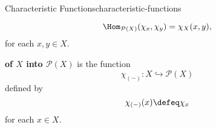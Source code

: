 \begin{definition}{Characteristic Functions}{characteristic-functions}
\begin{enumerate}
{                \[%
                    \Hom_{\mathcal{P}(X)}(\chi_{x},\chi_{y})%
                    =%
                    \chi_{X}(x,y),%
                \]%
                for each $x,y\in X$.
                \par\vspace*{-1.75\baselineskip}
            } %
            \textbf{of $X$ into $\mathcal{P}(X)$} is the function%
            \[%
                \chi_{(-)}%
                \colon%
                X
                \hookrightarrow%
                \mathcal{P}(X)
            \]%
            defined by
            \[
                \chi_{(-)}(x)
                \defeq
                \chi_{x}
            \]%
            for each $x\in X$.
    \end{enumerate}
\end{definition}
